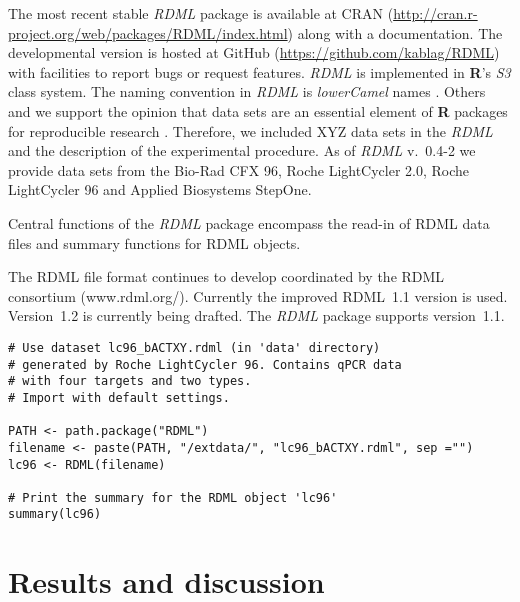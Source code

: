 \documentclass{bioinfo}
\begin{document}
The most recent stable \textit{RDML} package is available at CRAN 
(\url{http://cran.r-project.org/web/packages/RDML/index.html}) along with a 
documentation. The developmental version is hosted at GitHub 
(\url{https://github.com/kablag/RDML}) with facilities to report bugs or request 
features. \textit{RDML} is implemented in \textbf{R}’s \emph{S3} class system. 
The naming convention in \textit{RDML} is \textit{lowerCamel} names 
\cite{Baaaath_2012}. Others and we support the opinion that data sets are an 
essential element of \textbf{R} packages for reproducible research 
\cite{gentleman_2004,hofmann_2013,Leeper_2014}. Therefore, we included XYZ data 
sets in the \textit{RDML} and the description of the experimental procedure. As 
of \textit{RDML} v.~0.4-2 we provide data sets from the Bio-Rad CFX 96, Roche 
LightCycler 2.0, Roche LightCycler 96 and Applied Biosystems StepOne.

Central functions of the \textit{RDML} package encompass the read-in of RDML 
data files and summary functions for RDML objects.

The RDML file format continues to develop coordinated by the RDML consortium 
(www.rdml.org/). Currently the improved RDML~1.1 version is used. Version~1.2 is 
currently being drafted. The \textit{RDML} package supports version~1.1.

\begin{figure*}
\begin{verbatim}
# Use dataset lc96_bACTXY.rdml (in 'data' directory)
# generated by Roche LightCycler 96. Contains qPCR data
# with four targets and two types.
# Import with default settings.

PATH <- path.package("RDML")
filename <- paste(PATH, "/extdata/", "lc96_bACTXY.rdml", sep ="")
lc96 <- RDML(filename)

# Print the summary for the RDML object 'lc96'
summary(lc96)
\end{verbatim}
\end{figure*}


\section{Results and discussion}

%
%
%
%
%
%

%

\end{document}
